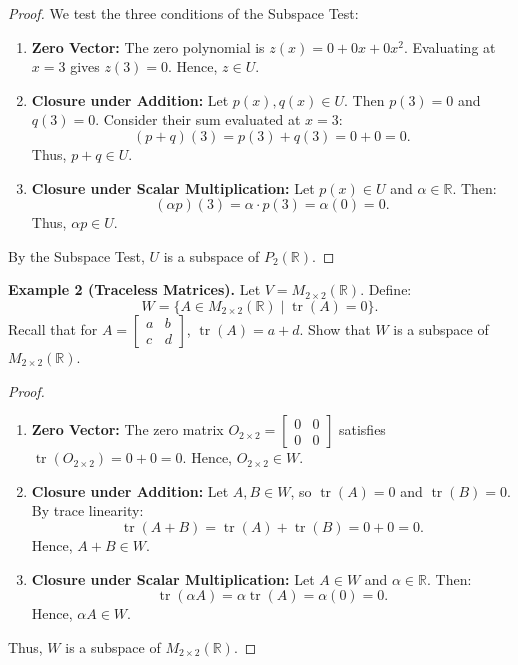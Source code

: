 \begin{proof}
We test the three conditions of the Subspace Test:
\begin{enumerate}[itemsep=0.8em, topsep=0.5em]
    \item \textbf{Zero Vector:} The zero polynomial is $z(x) = 0 + 0x + 0x^2$. Evaluating at $x = 3$ gives $z(3) = 0$. Hence, $z \in U$.
    \item \textbf{Closure under Addition:} Let $p(x), q(x) \in U$. Then $p(3) = 0$ and $q(3) = 0$. Consider their sum evaluated at $x = 3$:
    \[
    (p + q)(3) = p(3) + q(3) = 0 + 0 = 0.
    \]
    Thus, $p + q \in U$.
    \item \textbf{Closure under Scalar Multiplication:} Let $p(x) \in U$ and $\alpha \in \mathbb{R}$. Then:
    \[
    (\alpha p)(3) = \alpha \cdot p(3) = \alpha(0) = 0.
    \]
    Thus, $\alpha p \in U$.
\end{enumerate}
By the Subspace Test, $U$ is a subspace of $P_2(\mathbb{R})$.
\end{proof}

\medskip
\noindent\textbf{Example 2 (Traceless Matrices).} 
Let $V = M_{2\times 2}(\mathbb{R})$. Define:
\[
W = \{ A \in M_{2\times 2}(\mathbb{R}) \mid \operatorname{tr}(A) = 0 \}.
\]
Recall that for $A = \begin{bmatrix} a & b \\ c & d \end{bmatrix}$, $\operatorname{tr}(A) = a + d$. Show that $W$ is a subspace of $M_{2\times 2}(\mathbb{R})$.

\begin{proof}
\begin{enumerate}[itemsep=0.8em, topsep=0.5em]
    \item \textbf{Zero Vector:} The zero matrix $O_{2\times 2} = \begin{bmatrix} 0 & 0 \\ 0 & 0 \end{bmatrix}$ satisfies $\operatorname{tr}(O_{2\times 2}) = 0 + 0 = 0$. Hence, $O_{2\times 2} \in W$.
    \item \textbf{Closure under Addition:} Let $A, B \in W$, so $\operatorname{tr}(A) = 0$ and $\operatorname{tr}(B) = 0$. By trace linearity:
    \[
    \operatorname{tr}(A + B) = \operatorname{tr}(A) + \operatorname{tr}(B) = 0 + 0 = 0.
    \]
    Hence, $A + B \in W$.
    \item \textbf{Closure under Scalar Multiplication:} Let $A \in W$ and $\alpha \in \mathbb{R}$. Then:
    \[
    \operatorname{tr}(\alpha A) = \alpha \operatorname{tr}(A) = \alpha(0) = 0.
    \]
    Hence, $\alpha A \in W$.
\end{enumerate}
Thus, $W$ is a subspace of $M_{2\times 2}(\mathbb{R})$.
\end{proof}

